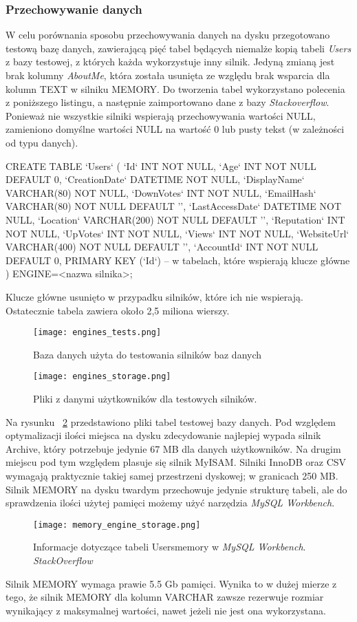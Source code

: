 \subsubsection{Przechowywanie danych}
W celu porównania sposobu przechowywania danych na dysku przegotowano testową bazę danych, zawierającą pięć tabel będących niemalże kopią tabeli \textit{Users} z bazy testowej, z których każda wykorzystuje inny silnik. Jedyną zmianą jest brak kolumny \textit{AboutMe}, która została usunięta ze względu brak wsparcia dla kolumn TEXT w silniku MEMORY. Do tworzenia tabel wykorzystano polecenia z poniższego listingu, a następnie zaimportowano dane z bazy \textit{Stackoverflow}. Ponieważ nie wszystkie silniki wspierają przechowywania wartości NULL, zamieniono domyślne wartości NULL na wartość 0 lub pusty tekst (w zależności od typu danych).
\begin{spverbatim}
	CREATE TABLE `Users` (
	`Id` INT NOT NULL,
	`Age` INT NOT NULL DEFAULT 0,
	`CreationDate` DATETIME NOT NULL,
	`DisplayName` VARCHAR(80) NOT NULL,
	`DownVotes` INT NOT NULL,
	`EmailHash` VARCHAR(80) NOT NULL DEFAULT '',
	`LastAccessDate` DATETIME NOT NULL,
	`Location` VARCHAR(200) NOT NULL DEFAULT '',
	`Reputation` INT NOT NULL,
	`UpVotes` INT NOT NULL,
	`Views` INT NOT NULL,
	`WebsiteUrl` VARCHAR(400) NOT NULL DEFAULT '',
	`AccountId` INT NOT NULL DEFAULT 0,
	PRIMARY KEY (`Id`) -- w tabelach, które wspierają klucze główne
	) ENGINE=<nazwa silnika>;
\end{spverbatim}
Klucze główne usunięto w przypadku silników, które ich nie wspierają. Ostatecznie tabela zawiera około 2,5 miliona wierszy.
\begin{figure}[!h]
	\caption{Baza danych użyta do testowania silników baz danych}
	\centering
	\texttt{[image: engines\_tests.png]}
	\label{fig:label}
\end{figure}
\begin{figure}[!h]
	\caption{Pliki z danymi użytkowników dla testowych silników.}
	\centering
	\texttt{[image: engines\_storage.png]}
	\label{fig:engines_storage}
\end{figure}

Na rysunku ~\ref{fig:engines_storage} przedstawiono pliki tabel testowej bazy danych. Pod względem optymalizacji ilości miejsca na dysku zdecydowanie najlepiej wypada silnik Archive, który potrzebuje jedynie 67 MB dla danych użytkowników. Na drugim miejscu pod tym względem plasuje się silnik MyISAM. Silniki InnoDB oraz CSV wymagają praktycznie takiej samej przestrzeni dyskowej; w granicach 250 MB. Silnik MEMORY na dysku twardym przechowuje jedynie strukturę tabeli, ale do sprawdzenia ilości użytej pamięci możemy użyć narzędzia \textit{MySQL Workbench}.
\begin{figure}[!h]
	\caption{Informacje dotyczące tabeli Users\textunderscore memory w \textit{MySQL Workbench}. \textit{StackOverflow}}
	\centering
	\texttt{[image: memory\_engine\_storage.png]}
	\label{fig:label}
\end{figure}
Silnik MEMORY wymaga prawie 5.5 Gb pamięci. Wynika to w dużej mierze z tego, że silnik MEMORY dla kolumn VARCHAR zawsze rezerwuje rozmiar wynikający z maksymalnej wartości, nawet jeżeli nie jest ona wykorzystana.





